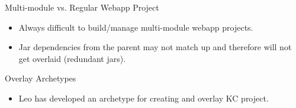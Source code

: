 \documentclass[xcolor=dvipsnames,14pt]{beamer}
\begin{document}
\begin{frame}{Multi-module vs. Regular Webapp Project}
  \begin{itemize}
    \item Always difficult to build/manage multi-module webapp
      projects.
    \item Jar dependencies from the parent may not match up and
      therefore will not get overlaid (redundant jars).
  \end{itemize}
\end{frame}

\begin{frame}{Overlay Archetypes}
  \begin{itemize}
  \item Leo has developed an archetype for creating and overlay KC project.
  \end{itemize}
\end{frame}
\end{document}
